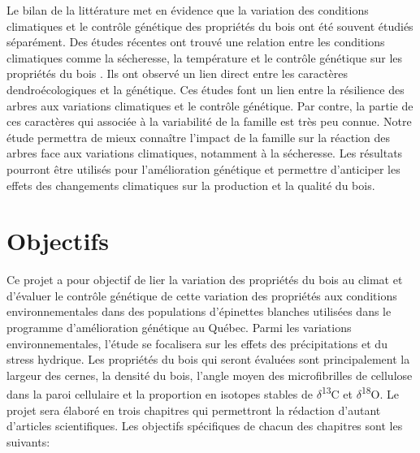 \documentclass[a4paper,12pt]{report}
\newcommand{\Ctreize}{$\delta$\textsuperscript{13}C\xspace}
\newcommand{\Odixhuit}{$\delta$\textsuperscript{18}O\xspace}
\begin{document}
Le bilan de la littérature met en évidence que la variation des conditions climatiques et le contrôle génétique des propriétés du bois ont été souvent étudiés séparément. Des études récentes ont trouvé une relation entre les conditions climatiques comme la sécheresse, la température et le contrôle génétique sur les propriétés du bois \citep{Housset2018, Heer2018}. Ils ont observé un lien direct entre les caractères dendroécologiques et la génétique. Ces études font un lien entre la résilience des arbres aux variations climatiques et le contrôle génétique. Par contre, la partie de ces caractères qui associée à la variabilité de la famille est très peu connue. Notre étude permettra de mieux connaître l'impact de la famille sur la réaction des arbres face aux variations climatiques, notamment à la sécheresse. Les résultats pourront être utilisés pour l'amélioration génétique et permettre d'anticiper les effets des changements climatiques sur la production et la qualité du bois. \\


\section{Objectifs}

Ce projet a pour objectif de lier la variation des propriétés du bois au climat et d'évaluer le contrôle génétique de cette variation des propriétés aux conditions environnementales dans des populations d'épinettes blanches utilisées dans le programme d'amélioration génétique au Québec. Parmi les variations environnementales, l'étude se focalisera sur les effets des précipitations et du stress hydrique. Les propriétés du bois qui seront évaluées sont principalement la largeur des cernes, la densité du bois, l'angle moyen des microfibrilles de cellulose dans la paroi cellulaire et la proportion en isotopes stables de \Ctreize et \Odixhuit. Le projet sera élaboré en trois chapitres qui permettront la rédaction d'autant d'articles scientifiques. Les objectifs spécifiques de chacun des chapitres sont les suivants:\\
\end{document}
